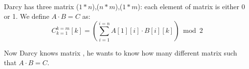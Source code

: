 Darcy has three matrix ($1*n$),($n*m$),($1*m$):
each element of matrix is either 0 or 1. We define $A \cdot B = C$ as:
$$
  C_{k=1}^{k=m}[k] = (\sum_{i=1}^{i=n} A[1][i] \cdot B[i][k]) \bmod 2
$$

Now Darcy knows matrix , he wants to know how many different matrix  such
that $A \cdot B = C$.

